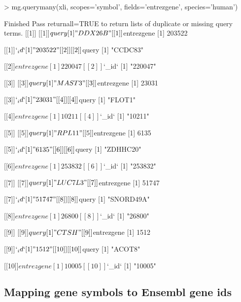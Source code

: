 \documentclass[12pt]{article}
\begin{document}
\begin{Schunk}
\begin{Sinput}
> mg.querymany(xli, scopes='symbol', fields='entrezgene', species='human')
\end{Sinput}
\begin{Soutput}
Finished
Pass returnall=TRUE to return lists of duplicate or missing query terms.
[[1]]
[[1]]$query
[1] "DDX26B"

[[1]]$entrezgene
[1] 203522

[[1]]$`_id`
[1] "203522"


[[2]]
[[2]]$query
[1] "CCDC83"

[[2]]$entrezgene
[1] 220047

[[2]]$`_id`
[1] "220047"


[[3]]
[[3]]$query
[1] "MAST3"

[[3]]$entrezgene
[1] 23031

[[3]]$`_id`
[1] "23031"


[[4]]
[[4]]$query
[1] "FLOT1"

[[4]]$entrezgene
[1] 10211

[[4]]$`_id`
[1] "10211"


[[5]]
[[5]]$query
[1] "RPL11"

[[5]]$entrezgene
[1] 6135

[[5]]$`_id`
[1] "6135"


[[6]]
[[6]]$query
[1] "ZDHHC20"

[[6]]$entrezgene
[1] 253832

[[6]]$`_id`
[1] "253832"


[[7]]
[[7]]$query
[1] "LUC7L3"

[[7]]$entrezgene
[1] 51747

[[7]]$`_id`
[1] "51747"


[[8]]
[[8]]$query
[1] "SNORD49A"

[[8]]$entrezgene
[1] 26800

[[8]]$`_id`
[1] "26800"


[[9]]
[[9]]$query
[1] "CTSH"

[[9]]$entrezgene
[1] 1512

[[9]]$`_id`
[1] "1512"


[[10]]
[[10]]$query
[1] "ACOT8"

[[10]]$entrezgene
[1] 10005

[[10]]$`_id`
[1] "10005"
\end{Soutput}
\end{Schunk}

\subsection{Mapping gene symbols to Ensembl gene ids}
\end{document}

